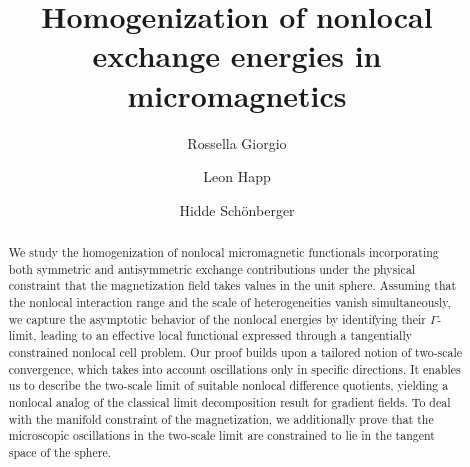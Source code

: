 \documentclass[reqno,11pt]{amsart}
\title{Homogenization of nonlocal exchange energies in micromagnetics}
\author{Rossella Giorgio}
\author{Leon Happ}
\author{Hidde Sch\"onberger}
\numberwithin{equation}{section}
\theoremstyle{thmlemcorr}
\numberwithin{theorem}{section}
\theoremstyle{thmlemcorr*}
\theoremstyle{defi}
\theoremstyle{remexample}
\theoremstyle{ass}
\newcommand{\1}{\mathds{1}}
\begin{document}
\allowdisplaybreaks

\thispagestyle{empty}

\thispagestyle{empty}
\begin{abstract}  
We study the homogenization of nonlocal micromagnetic functionals incorporating both symmetric and antisymmetric exchange contributions under the physical constraint that the magnetization field takes values in the unit sphere. Assuming that the nonlocal interaction range and the scale of heterogeneities vanish simultaneously, we capture the asymptotic behavior of the nonlocal energies by identifying their
$\Gamma$-limit, leading to an effective local functional expressed through a tangentially constrained nonlocal cell problem. %
Our proof builds upon a tailored notion of two-scale convergence, which takes into account oscillations only in specific directions. It enables us to describe the two-scale limit of suitable nonlocal difference quotients, yielding a nonlocal analog of the classical limit decomposition result for gradient fields. To deal with the manifold constraint of the magnetization, we additionally prove that the microscopic oscillations in the two-scale limit are constrained to lie in the tangent space of the sphere.




\end{abstract}
\end{document}
